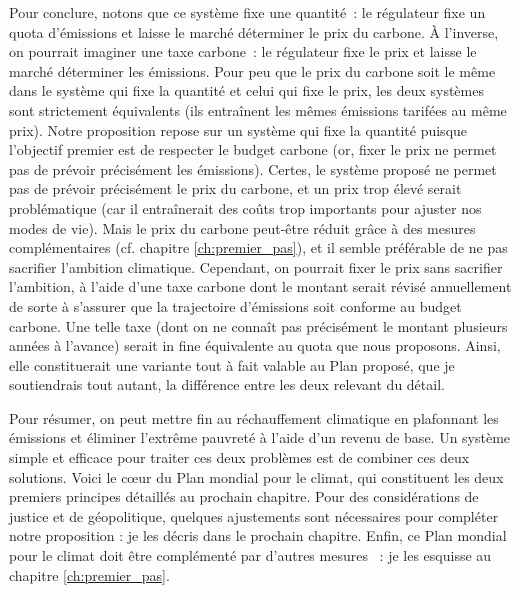 \documentclass[a5paper,french]{memoir}
\begin{document}
Pour conclure, notons que ce système fixe une quantité~: le régulateur fixe un quota d'émissions et laisse le marché déterminer le prix du carbone. À l'inverse, on pourrait imaginer une taxe carbone~: le régulateur fixe le prix et laisse le marché déterminer les émissions. Pour peu que le prix du carbone soit le même dans le système qui fixe la quantité et celui qui fixe le prix, les deux systèmes sont strictement équivalents (ils entraînent les mêmes émissions tarifées au même prix). Notre proposition repose sur un système qui fixe la quantité puisque l'objectif premier est de respecter le budget carbone (or, fixer le prix ne permet pas de prévoir précisément les émissions). Certes, le système proposé ne permet pas de prévoir précisément le prix du carbone, et un prix trop élevé serait problématique (car il entraînerait des coûts trop importants pour ajuster nos modes de vie). Mais le prix du carbone peut-être réduit grâce à des mesures complémentaires (cf. chapitre \ref{ch:premier_pas}), et il semble préférable de ne pas sacrifier l'ambition climatique. Cependant, on pourrait fixer le prix sans sacrifier l'ambition, à l'aide d'une taxe carbone dont le montant serait révisé annuellement de sorte à s'assurer que la trajectoire d'émissions soit conforme au budget carbone. Une telle taxe (dont on ne connaît pas précisément le montant plusieurs années à l'avance) serait in fine équivalente au quota que nous proposons. Ainsi, elle constituerait une variante tout à fait valable au Plan proposé, que je soutiendrais tout autant, la différence entre les deux relevant du détail. 

Pour résumer, on peut mettre fin au réchauffement climatique en plafonnant les émissions et éliminer l'extrême pauvreté à l'aide d'un revenu de base. Un système simple et efficace pour traiter ces deux problèmes est de combiner ces deux solutions. Voici le cœur du Plan mondial pour le climat, %
qui constituent les deux premiers principes détaillés au prochain chapitre. Pour des considérations de justice et de géopolitique, quelques ajustements sont nécessaires pour compléter notre proposition : je les décris dans le prochain chapitre. %
Enfin, ce Plan mondial pour le climat doit être complémenté par d'autres mesures%
~: je les esquisse au chapitre \ref{ch:premier_pas}.
\end{document}
